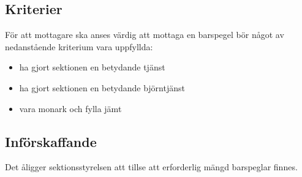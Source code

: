 \documentclass[a4paper]{dtek}
\begin{document}
\subsection{Kriterier}
För att mottagare ska anses värdig att mottaga en barspegel bör något av nedanstående kriterium vara uppfyllda:
\begin{itemize}
\item ha gjort sektionen en betydande tjänst
\item ha gjort sektionen en betydande björntjänst
\item vara monark och fylla jämt
\end{itemize}
\subsection{Införskaffande}
Det åligger sektionsstyrelsen att tillse att erforderlig mängd barspeglar finnes.
\end{document}
